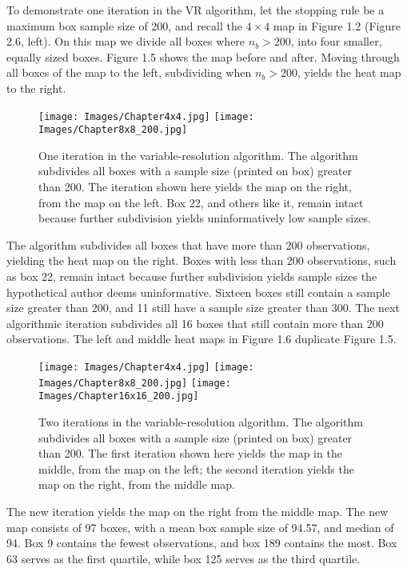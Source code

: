 To demonstrate one iteration in the VR algorithm, let the stopping rule be a maximum box sample size of 200, and recall the $4 \times 4$ map in Figure 1.2 (Figure 2.6, left). On this map we divide all boxes where $n_{b} > 200$, into four smaller, equally sized boxes. Figure 1.5 shows the map before and after. Moving through all boxes of the map to the left, subdividing when $n_{b} > 200$, yields the heat map to the right.
        \begin{figure}[H]
      	\centering
      	\texttt{[image: Images/Chapter4x4.jpg]} 
      	\texttt{[image: Images/Chapter8x8\_200.jpg]} 
      	\caption{One iteration in the variable-resolution algorithm. The algorithm subdivides all boxes with a sample size (printed on box) greater than 200. The iteration shown here yields the map on the right, from the map on the left. Box 22, and others like it, remain intact because further subdivision yields uninformatively low sample sizes.}
      	\end{figure} 
The algorithm subdivides all boxes that have more than 200 observations, yielding the heat map on the right. Boxes with less than 200 observations, such as box 22, remain intact because further subdivision yields sample sizes the hypothetical author deems uninformative. Sixteen boxes still contain a sample size greater than 200, and 11 still have a sample size greater than 300. The next algorithmic iteration subdivides all 16 boxes that still contain more than 200 observations. The left and middle heat maps in Figure 1.6 duplicate Figure 1.5. 
        \begin{figure}[H]
      	\centering
      	\texttt{[image: Images/Chapter4x4.jpg]}
      	\texttt{[image: Images/Chapter8x8\_200.jpg]} 
      	\texttt{[image: Images/Chapter16x16\_200.jpg]} 
      	\caption{Two iterations in the variable-resolution algorithm. The algorithm subdivides all boxes with a sample size (printed on box) greater than 200. The first iteration shown here yields the map in the middle, from the map on the left; the second iteration yields the map on the right, from the middle map.}
      	\end{figure}
The new iteration yields the map on the right from the middle map. The new map consists of 97 boxes, with a mean box sample size of 94.57, and median of 94. Box 9 contains the fewest observations, and box 189 contains the most. Box 63 serves as the first quartile, while box 125 serves as the third quartile. 

